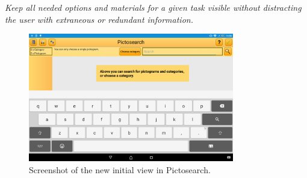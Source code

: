 \begin{displayquote}
\textit{Keep all needed options and materials for a given task visible without distracting the user with extraneous or redundant information.} \cite[p.~55]{DESIGNBOOK}
\end{displayquote}

\begin{figure}[ht]
    \centering
    \includegraphics[width=0.8\textwidth]{figures/img/screenshots/new_startup.png}
    \caption{Screenshot of the new initial view in Pictosearch.}\label{fig:screenshot_newstartup}
\end{figure}

